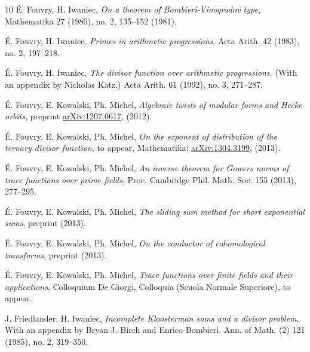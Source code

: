 \documentclass[12pt,a4paper,reqno]{amsart}
\numberwithin{equation}{section}
\theoremstyle{plain}
\theoremstyle{definition}
\begin{document}
\begin{thebibliography}{10}
 \'E. Fouvry, H. Iwaniec, \emph{On a theorem of
    Bombieri-Vinogradov type}, Mathematika 27 (1980), no. 2, 135--152
  (1981).

 \'E. Fouvry, H. Iwaniec, \emph{Primes in arithmetic
    progressions}, Acta Arith. 42 (1983), no. 2, 197--218.

 \'E. Fouvry, H. Iwaniec, \emph{ The divisor function
    over arithmetic progressions.}  (With an appendix by Nicholas
  Katz.)  Acta Arith.  61 (1992), no. 3, 271--287.

 \'E. Fouvry, E. Kowalski, Ph. Michel, \emph{Algebraic
    twists of modular forms and Hecke orbits}, preprint
  \url{arXiv:1207.0617}, (2012).

 \'E. Fouvry, E. Kowalski, Ph. Michel, \emph{On the
    exponent of distribution of the ternary divisor function},
  to appear, Mathematika; \url{arXiv:1304.3199}, (2013).

 \'E. Fouvry, E. Kowalski, Ph. Michel, \emph
  {An inverse theorem for Gowers norms of trace functions over prime
    fields}, Proc. Cambridge Phil. Math. Soc. 155 (2013), 277--295.

 \'E. Fouvry, E. Kowalski, Ph. Michel, \emph {The
     sliding sum method for short exponential sums}, preprint (2013).

  \'E. Fouvry, E. Kowalski, Ph. Michel, \emph{On
     the conductor of cohomological transforms}, preprint (2013).

  \'E. Fouvry, E. Kowalski, Ph. Michel, \emph{Trace
     functions over finite fields and their applications}, Colloquium
   De Giorgi, Colloquia (Scuola Normale Superiore), to appear.



  J. Friedlander, H. Iwaniec, \emph{Incomplete
     Kloosterman sums and a divisor problem}, With an appendix by
   Bryan J. Birch and Enrico Bombieri. Ann. of Math. (2) 121 (1985),
   no. 2, 319--350.


\end{thebibliography}
\end{document}
